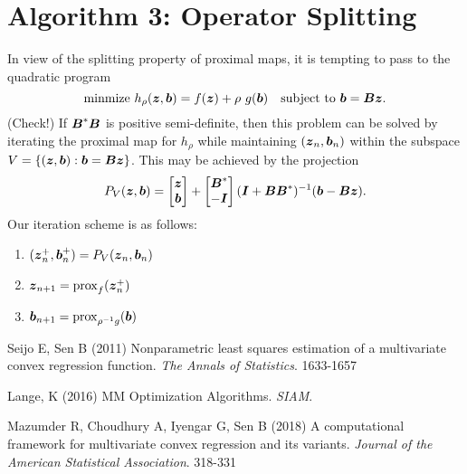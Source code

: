 \documentclass{article}
\begin{document}
\section*{\center Algorithm 3: Operator Splitting}

In view of the splitting property of proximal maps, it is tempting to pass to the quadratic program
\begin{equation*}
    \mathrm{minmize}~h_{\rho}(\boldsymbol{z}, \boldsymbol{b}) =
        f(\boldsymbol{z}) + \rho~g(\boldsymbol{b})
    \quad \text{subject to}~\boldsymbol{b} = \boldsymbol{B} \boldsymbol{z}.
\end{equation*}
(Check!) If \(\boldsymbol{B}^{\ast} \boldsymbol{B}\) is positive semi-definite, then this problem can be solved by iterating the proximal map for \(h_{\rho}\) while maintaining \((\boldsymbol{z}_{n}, \boldsymbol{b}_{n})\) within the subspace \(V = \{(\boldsymbol{z}, \boldsymbol{b}) : \boldsymbol{b} = \boldsymbol{B} \boldsymbol{z}\}\).
This may be achieved by the projection
\begin{equation*}
    P_{V}(\boldsymbol{z}, \boldsymbol{b})
    =
    \begin{bmatrix}
        \boldsymbol{z} \\
        \boldsymbol{b}
    \end{bmatrix}
    +
    \begin{bmatrix}
        \boldsymbol{B}^{\ast} \\
        -\boldsymbol{I}
    \end{bmatrix}
    (\boldsymbol{I} + \boldsymbol{B} \boldsymbol{B}^{\ast})^{-1} (\boldsymbol{b} - \boldsymbol{B} \boldsymbol{z}).
\end{equation*}
Our iteration scheme is as follows:
\begin{enumerate}
    \item \((\boldsymbol{z}_{n}^{+}, \boldsymbol{b}_{n}^{+}) = P_{V}(\boldsymbol{z}_{n}, \boldsymbol{b}_{n})\)
    \item \(\boldsymbol{z}_{n+1} = \mathop{\rm prox}\nolimits_{f}(\boldsymbol{z}_{n}^{+})\)
    \item \(\boldsymbol{b}_{n+1} = \mathop{\rm prox}\nolimits_{\rho^{-1}g}(\boldsymbol{b})\)
\end{enumerate}

\begin{thebibliography}{99}
    Seijo E, Sen B (2011) {Nonparametric least squares estimation of a multivariate convex regression function}. {\it The Annals of Statistics}. 1633-1657
    
    Lange, K (2016) {MM Optimization Algorithms}. {\it SIAM}.

    Mazumder R, Choudhury A, Iyengar G, Sen B (2018) {A computational framework for multivariate convex regression and its variants}. {\it Journal of the American Statistical Association}. 318-331
\end{thebibliography}
\end{document}
